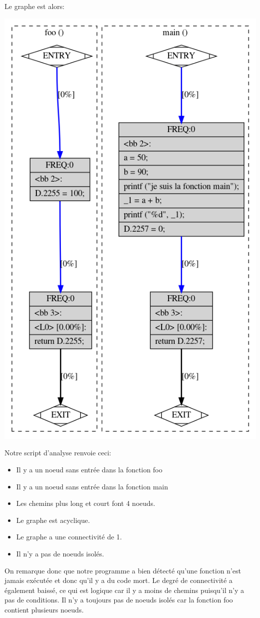 Le graphe est alors:
\begin{center}
    \includegraphics[scale=0.35]{images/fonction_inutile.png}
\end{center}

Notre script d'analyse renvoie ceci:
\begin{itemize}
    \item Il y a un noeud sans entrée dans la fonction foo
    \item Il y a un noeud sans entrée dans la fonction main
    \item Les chemins plus long et court font 4 noeuds.
    \item Le graphe est acyclique.
    \item Le graphe a une connectivité de 1.
    \item Il n'y a pas de noeuds isolés.
\end{itemize}
On remarque donc que notre programme a bien détecté qu'une fonction n'est jamais exécutée et donc qu'il y a du code mort. Le degré de connectivité a également baissé, ce qui est logique car il y a moins de chemins puisqu'il n'y a pas de conditions. Il n'y a toujours pas de noeuds isolés car la fonction foo contient plusieurs noeuds.